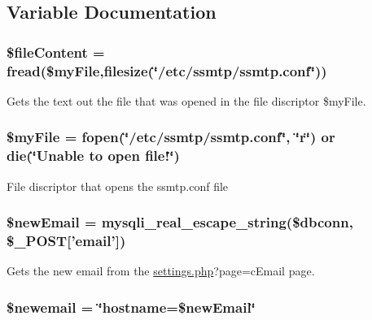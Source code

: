 \subsection{\-Variable \-Documentation}
\hypertarget{changeEmail_8php_ad89080bb6e501b4f254f01ee5d24fa2d}{
\subsubsection[{\$file\-Content}]{\setlength{\rightskip}{0pt plus 5cm}\$file\-Content = fread(\$my\-File,filesize(\char`\"{}/etc/ssmtp/ssmtp.\-conf\char`\"{}))}}\label{changeEmail_8php_ad89080bb6e501b4f254f01ee5d24fa2d}
\-Gets the text out the file that was opened in the file discriptor \$my\-File. \hypertarget{changeEmail_8php_aec8c77a99462294dbbfb1639bd8b5165}{
\subsubsection[{\$my\-File}]{\setlength{\rightskip}{0pt plus 5cm}\$my\-File = fopen(\char`\"{}/etc/ssmtp/ssmtp.\-conf\char`\"{}, \char`\"{}r\char`\"{}) or die(\char`\"{}\-Unable to open file!\char`\"{})}}\label{changeEmail_8php_aec8c77a99462294dbbfb1639bd8b5165}
\-File discriptor that opens the ssmtp.\-conf file \hypertarget{changeEmail_8php_ab8dfe1defb9b0561a165b59f387dfebd}{
\subsubsection[{\$new\-Email}]{\setlength{\rightskip}{0pt plus 5cm}\$new\-Email = mysqli\-\_\-real\-\_\-escape\-\_\-string(\$dbconn, \$\-\_\-\-P\-O\-S\-T\mbox{[}'email'\mbox{]})}}\label{changeEmail_8php_ab8dfe1defb9b0561a165b59f387dfebd}
\-Gets the new email from the \hyperlink{settings_8php}{settings.\-php}?page=c\-Email page. \hypertarget{changeEmail_8php_a9ca73f95fb990256fbfb6c68f5a7737b}{
\subsubsection[{\$newemail}]{\setlength{\rightskip}{0pt plus 5cm}\$newemail = \char`\"{}hostname=\$new\-Email\char`\"{}}}\label{changeEmail_8php_a9ca73f95fb990256fbfb6c68f5a7737b}
